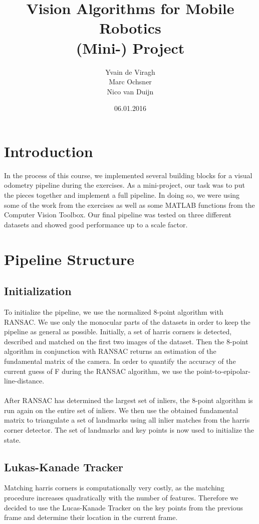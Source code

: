 \documentclass[11pt]{article}
\title{Vision Algorithms for Mobile Robotics\\ (Mini-) Project}
\author{Yvain de Viragh\\Marc Ochsner\\Nico van Duijn}
\date{06.01.2016}
\begin{document}
\maketitle
{}


\section{Introduction}
In the process of this course, we implemented several building blocks for a visual odometry pipeline during the exercises. As a mini-project, our task was to put the pieces together and implement a full pipeline. In doing so, we were using some of the work from the exercises as well as some MATLAB functions from the Computer Vision Toolbox. Our final pipeline was tested on three different datasets and showed good performance up to a scale factor.


\section{Pipeline Structure}
\subsection{Initialization}
To initialize the pipeline, we use the normalized 8-point algorithm with RANSAC. We use only the monocular parts of the datasets in order to keep the pipeline as general as possible. Initially, a set of harris corners is detected, described and matched on the first two images of the dataset. Then the 8-point algorithm in conjunction with RANSAC returns an estimation of the fundamental matrix of the camera. In order to quantify the accuracy of the current guess of F during the RANSAC algorithm, we use the point-to-epipolar-line-distance.\\
\\
After RANSAC has determined the largest set of inliers, the 8-point algorithm is run again on the entire set of inliers. We then use the obtained fundamental matrix to triangulate a set of landmarks using all inlier matches from the harris corner detector. The set of landmarks and key points is now used to initialize the state.

\subsection{Lukas-Kanade Tracker}
Matching harris corners is computationally very costly, as the matching procedure increases quadratically with the number of features. Therefore we decided to use the Lucas-Kanade Tracker on the key points from the previous frame and determine their location in the current frame. 
\end{document}
